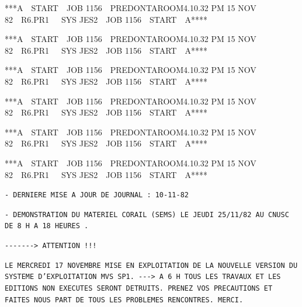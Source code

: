 {}

{\fontsize{4.4}{5.5}\selectfont\ttfamily ****A\ \ START\ \ JOB 1156\ \ PREDONTA\hfill ROOM\hfill 4.10.32 PM 15 NOV 82\ \ R6.PR1\ \ \ SYS JES2\ \ JOB 1156\ \ START\ \ A****}

{\fontsize{4.4}{5.5}\selectfont\ttfamily ****A\ \ START\ \ JOB 1156\ \ PREDONTA\hfill ROOM\hfill 4.10.32 PM 15 NOV 82\ \ R6.PR1\ \ \ SYS JES2\ \ JOB 1156\ \ START\ \ A****}

{\fontsize{4.4}{5.5}\selectfont\ttfamily ****A\ \ START\ \ JOB 1156\ \ PREDONTA\hfill ROOM\hfill 4.10.32 PM 15 NOV 82\ \ R6.PR1\ \ \ SYS JES2\ \ JOB 1156\ \ START\ \ A****}

{\fontsize{4.4}{5.5}\selectfont\ttfamily ****A\ \ START\ \ JOB 1156\ \ PREDONTA\hfill ROOM\hfill 4.10.32 PM 15 NOV 82\ \ R6.PR1\ \ \ SYS JES2\ \ JOB 1156\ \ START\ \ A****}

{\fontsize{4.4}{5.5}\selectfont\ttfamily ****A\ \ START\ \ JOB 1156\ \ PREDONTA\hfill ROOM\hfill 4.10.32 PM 15 NOV 82\ \ R6.PR1\ \ \ SYS JES2\ \ JOB 1156\ \ START\ \ A****}

{\fontsize{4.4}{5.5}\selectfont\ttfamily ****A\ \ START\ \ JOB 1156\ \ PREDONTA\hfill ROOM\hfill 4.10.32 PM 15 NOV 82\ \ R6.PR1\ \ \ SYS JES2\ \ JOB 1156\ \ START\ \ A****}

\texttt{- DERNIERE MISE A JOUR DE JOURNAL : 10-11-82}

\texttt{- DEMONSTRATION DU MATERIEL CORAIL (SEMS) LE JEUDI 25/11/82 AU CNUSC DE 8 H A 18 HEURES .}

\texttt{-{}-{}-{}-{}-{}-{}-> ATTENTION !!!}

\texttt{LE MERCREDI 17 NOVEMBRE MISE EN EXPLOITATION DE LA NOUVELLE VERSION DU SYSTEME D'EXPLOITATION MVS SP1. -{}-{}-> A 6 H TOUS LES TRAVAUX ET LES EDITIONS NON EXECUTES SERONT DETRUITS. PRENEZ VOS PRECAUTIONS ET FAITES NOUS PART DE TOUS LES PROBLEMES RENCONTRES. MERCI.}

